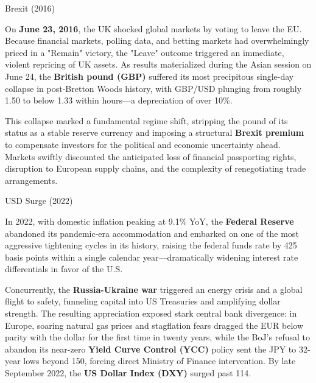 \documentclass[10pt]{article}
\begin{document}
    \begin{core}[label=core:brexit]{Brexit (2016)}

      On \textbf{June 23, 2016}, the UK shocked global markets by voting to leave the EU. Because financial markets, polling data, and betting markets had overwhelmingly priced in a "Remain" victory, the "Leave" outcome triggered an immediate, violent repricing of UK assets. As results materialized during the Asian session on June 24, the \textbf{British pound (GBP)} suffered its most precipitous single-day collapse in post-Bretton Woods history, with GBP/USD plunging from roughly 1.50 to below 1.33 within hours---a depreciation of over 10\%.


      This collapse marked a fundamental regime shift, stripping the pound of its status as a stable reserve currency and imposing a structural \textbf{Brexit premium} to compensate investors for the political and economic uncertainty ahead. Markets swiftly discounted the anticipated loss of financial passporting rights, disruption to European supply chains, and the complexity of renegotiating trade arrangements.

    \end{core}

    \begin{core}[label=core:usd_surge]{USD Surge (2022)}

      In 2022, with domestic inflation peaking at 9.1\% YoY, the \textbf{Federal Reserve} abandoned its pandemic-era accommodation and embarked on one of the most aggressive tightening cycles in its history, raising the federal funds rate by 425 basis points within a single calendar year---dramatically widening interest rate differentials in favor of the U.S.

      Concurrently, the \textbf{Russia-Ukraine war} triggered an energy crisis and a global flight to safety, funneling capital into US Treasuries and amplifying dollar strength. The resulting appreciation exposed stark central bank divergence: in Europe, soaring natural gas prices and stagflation fears dragged the EUR below parity with the dollar for the first time in twenty years, while the BoJ's refusal to abandon its near-zero \textbf{Yield Curve Control (YCC)} policy sent the JPY to 32-year lows beyond 150, forcing direct Ministry of Finance intervention. By late September 2022, the \textbf{US Dollar Index (DXY)} surged past 114.


    \end{core}
\end{document}
